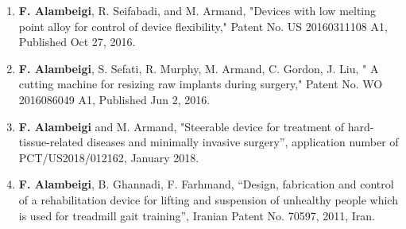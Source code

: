 \begin{cvskills}
  \cvskill 
  {} %
    {\begin{enumerate}
    		\item \textbf{F. Alambeigi}, R. Seifabadi, and M. Armand, "Devices with low melting point alloy for control of device flexibility," Patent No. US 20160311108 A1, Published Oct 27, 2016.
    		\item \textbf{F. Alambeigi}, S. Sefati, R. Murphy, M. Armand, C. Gordon, J. Liu, " A cutting machine for resizing raw implants during surgery," Patent No. WO 2016086049 A1, Published Jun 2, 2016.
    		\item \textbf{F. Alambeigi} and M. Armand, "Steerable device for treatment of hard-tissue-related diseases and minimally invasive surgery”, application number of PCT/US2018/012162, January 2018.
       		\item\textbf{ F. Alambeigi}, B. Ghannadi, F. Farhmand, “Design, fabrication and control of a rehabilitation device for lifting and suspension of unhealthy people which is used for treadmill gait training”, Iranian Patent No. 70597, 2011, Iran.
    		    \end{enumerate}} %
 \end{cvskills}
